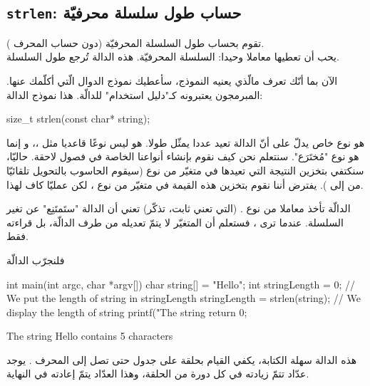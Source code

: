 \subsection{\texttt{strlen}: حساب طول سلسلة محرفيّة}

تقوم بحساب طول السلسلة المحرفيّة (دون حساب المحرف
).\\
يحب أن تعطيها معاملا وحيدا: السلسلة المحرفيّة. هذه الدالة تُرجع طول السلسلة.

الآن بما أنّك تعرف مالّذي يعنيه النموذج، سأعطيك نموذج الدوال الّتي أكلّمك عنها. المبرمجون يعتبرونه كـ"دليل استخدام" للدالّة.
هذا نموذج الدالة:

\begin{Csource}
size_t strlen(const char* string);
\end{Csource}

\begin{information}
هو نوع خاص يدلّ على أنّ الدالة تعيد عددا يمثّل طولا. هو ليس نوعًا قاعديا مثل
،،
و إنما هو نوع  "مُختَرَع". سنتعلم نحن كيف نقوم بإنشاء أنواعنا الخاصة في فصول لاحقة. حاليّا، سنكتفي بتخزين النتيجة التي تعيدها
في متغيّر من نوع
(سيقوم الحاسوب بالتحويل تلقائيّا من
إلى
).
يفترض أننا نقوم بتخزين هذه القيمة في متغيّر من نوع
،
لكن عمليّا
كاف لهذا.
\end{information}

الدالّة تأخذ معاملا من نوع
.
 (التي تعني ثابت، تذكّر) تعني أن الدالة "ستَمتَنِع" عن تغير السلسلة. عندما ترى
،
فستعلم أن المتغيّر لا يتمّ تعديله من طرف الدالّة، بل قراءته فقط.

فلنجرّب الدالّة 

\begin{Csource}
int main(int argc, char *argv[])
{
	char string[] = "Hello";
	int stringLength = 0;
	// We put the length of string in stringLength
	 stringLength = strlen(string);
	// We display the length of string
	printf("The string %
	return 0;
}
\end{Csource}

\begin{Console}
The string Hello contains 5 characters
\end{Console}

هذه الدالة سهلة الكتابة، يكفي القيام بحلقة على جدول
حتى تصل إلى المحرف
.
يوجد عدّاد تتمّ زيادته في كل دورة من الحلقة، وهذا العدّاد يتمّ إعادته في النهاية.

